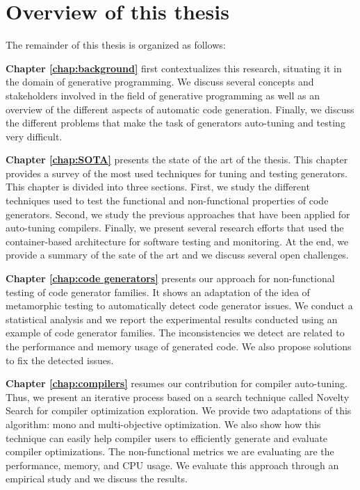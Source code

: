 \section{Overview of this thesis}
The remainder of this thesis is organized  as follows:

\textbf{Chapter \ref{chap:background}} first contextualizes this research, situating it in the domain of generative programming. We discuss several concepts and stakeholders involved in the field of generative programming as well as an overview of the different aspects of automatic code generation. Finally, we discuss the different problems that make the task of generators auto-tuning and testing very difficult.

\textbf{Chapter \ref{chap:SOTA}} presents the state of the art of the thesis. This chapter provides a survey of the most used techniques for tuning and testing generators.
This chapter is divided into three sections. First, we study the different techniques used to test the functional and non-functional properties of code generators. Second, we study the previous approaches that have been applied for auto-tuning compilers. Finally, we present several research efforts that used the container-based architecture for software testing and monitoring. At the end, we provide a summary of the sate of the art and we discuss several open challenges.

\textbf{Chapter \ref{chap:code generators}} presents our approach for non-functional testing of code generator families. It shows an adaptation of the idea of metamorphic testing to automatically detect code generator issues. We conduct a statistical analysis and we report the experimental results conducted using an example of code generator families. The inconsistencies we detect are related to the performance and memory usage of generated code. We also propose solutions to fix the detected issues.

\textbf{Chapter \ref{chap:compilers}} resumes our contribution for compiler auto-tuning. Thus, we present an iterative process based on a search technique called Novelty Search for compiler optimization exploration. We provide two adaptations of this algorithm: mono and multi-objective optimization. We also show how this technique can easily help compiler users to efficiently generate and evaluate compiler optimizations. The non-functional metrics we are evaluating are the performance, memory, and CPU usage. We evaluate this approach through an empirical study and we discuss the results.

